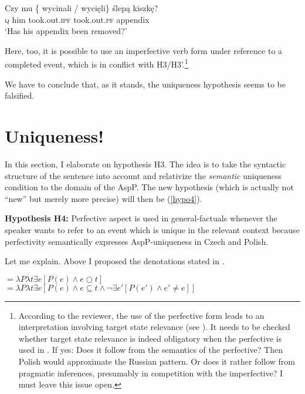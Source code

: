 \documentclass[output=paper,
modfonts,
newtxmath,
hidelinks
]{langscibook}
\begin{document}
\begin{exe}
\ex\label{blinddarmpo}
\gll Czy mu  \{\hspace{-2pt} wycinali / wyci\k eli\}  {\'slep\k a kiszk\k e?} \\
\textsc{q} him {} took.out.\textsc{ipf} {} took.out.\textsc{pf} appendix \\
\glt `Has his appendix been removed?'
\end{exe}

\noindent Here, too, it is possible to use an imperfective verb form under reference to a completed event, which is in conflict with H3/H3'.\footnote{According to the reviewer, the use of the perfective form leads to an interpretation involving target state relevance (see ). It needs to be checked whether target state relevance is indeed obligatory when the perfective is used in . If yes: Does it follow from the semantics of the perfective? Then Polish would approximate the Russian pattern. Or does it rather follow from pragmatic inferences, presumably in competition with the imperfective? I must leave this issue open.}

We have to conclude that, as it stands, the uniqueness hypothesis seems to be falsified.  

\section{Uniqueness!}\label{s6} 

In this section, I elaborate on hypothesis H3. The idea is to take the syntactic structure of the sentence into account 
and relativize the \textit{semantic} uniqueness condition to the domain of the AspP. The new hypothesis (which is actually not ``new'' but merely more precise) will then be (\ref{hypo4}). 

\begin{exe}
\ex\label{hypo4}
\textbf{Hypothesis H4:} Perfective aspect is used in general-factuals whenever the speaker wants to refer to an event which is unique in the relevant context because perfectivity semantically expresses AspP-uniqueness in Czech and Polish. 
\end{exe}

\noindent Let me explain. Above I proposed the denotations stated in .

\begin{exe}
\ex\label{semas}
${}= \lambda P \lambda t \exists e [ P(e) \wedge e \bigcirc t ]$\smallskip\\
${}= \lambda P \lambda t \exists e [ P(e) \wedge e \subseteq t \wedge \neg \exists e'[ P(e') \wedge e' \neq e ]]$
\end{exe}
\end{document}
